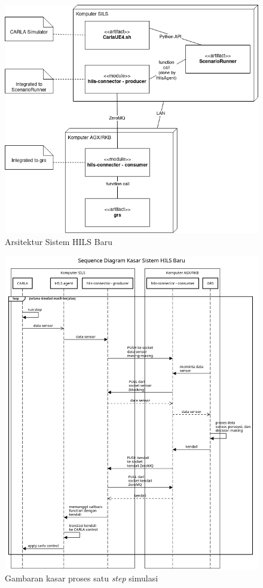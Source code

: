 \begin{figure}[h!]
	\centering
	\includegraphics[width=1.0\textwidth]{resources/chapter-3/deployment-diagram-new-hils.png}
	\caption{Arsitektur Sistem HILS Baru}
	\label{chapter-3-new-architecture}
\end{figure}

\begin{figure}[h!]
	\centering
	\includegraphics[width=1.0\textwidth]{resources/chapter-3/sequence-diagram-new-hils-kasar.png}
	\caption{Gambaran kasar proses satu \textit{step} simulasi}
	\label{chapter-3-new-sequence}
\end{figure}
